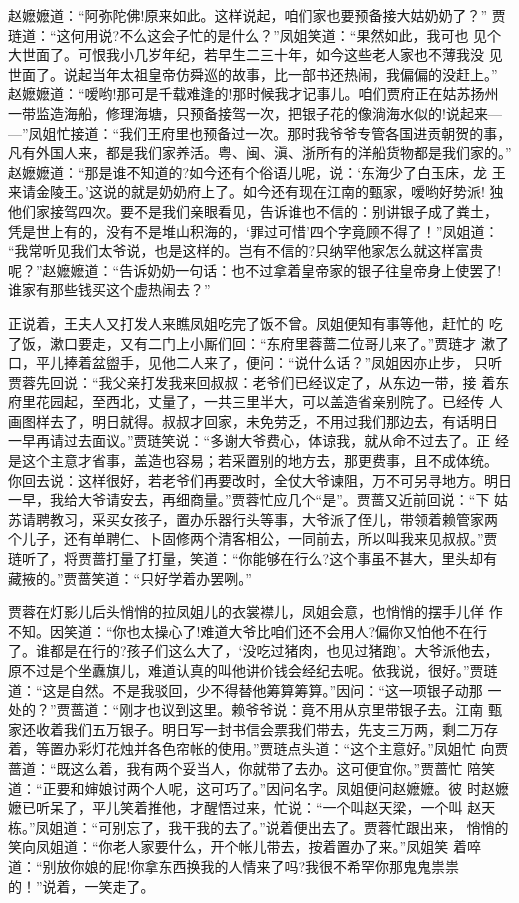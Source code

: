 赵嬷嬷道：“阿弥陀佛!原来如此。这样说起，咱们家也要预备接大姑奶奶了？”
贾琏道：“这何用说?不么这会子忙的是什么？”凤姐笑道：“果然如此，我可也
见个大世面了。可恨我小几岁年纪，若早生二三十年，如今这些老人家也不薄我没
见世面了。说起当年太祖皇帝仿舜巡的故事，比一部书还热闹，我偏偏的没赶上。”
赵嬷嬷道：“嗳哟!那可是千载难逢的!那时候我才记事儿。咱们贾府正在姑苏扬州
一带监造海船，修理海塘，只预备接驾一次，把银子花的像淌海水似的!说起来—
—”凤姐忙接道：“我们王府里也预备过一次。那时我爷爷专管各国进贡朝贺的事，
凡有外国人来，都是我们家养活。粤、闽、滇、浙所有的洋船货物都是我们家的。”
赵嬷嬷道：“那是谁不知道的?如今还有个俗语儿呢，说：‘东海少了白玉床，龙
王来请金陵王。’这说的就是奶奶府上了。如今还有现在江南的甄家，嗳哟好势派!
独他们家接驾四次。要不是我们亲眼看见，告诉谁也不信的：别讲银子成了粪土，
凭是世上有的，没有不是堆山积海的，‘罪过可惜’四个字竟顾不得了！”凤姐道：
“我常听见我们太爷说，也是这样的。岂有不信的?只纳罕他家怎么就这样富贵
呢？”赵嬷嬷道：“告诉奶奶一句话：也不过拿着皇帝家的银子往皇帝身上使罢了!
谁家有那些钱买这个虚热闹去？”

正说着，王夫人又打发人来瞧凤姐吃完了饭不曾。凤姐便知有事等他，赶忙的
吃了饭，漱口要走，又有二门上小厮们回：“东府里蓉蔷二位哥儿来了。”贾琏才
漱了口，平儿捧着盆盥手，见他二人来了，便问：“说什么话？”凤姐因亦止步，
只听贾蓉先回说：“我父亲打发我来回叔叔：老爷们已经议定了，从东边一带，接
着东府里花园起，至西北，丈量了，一共三里半大，可以盖造省亲别院了。已经传
人画图样去了，明日就得。叔叔才回家，未免劳乏，不用过我们那边去，有话明日
一早再请过去面议。”贾琏笑说：“多谢大爷费心，体谅我，就从命不过去了。正
经是这个主意才省事，盖造也容易；若采置别的地方去，那更费事，且不成体统。
你回去说：这样很好，若老爷们再要改时，全仗大爷谏阻，万不可另寻地方。明日
一早，我给大爷请安去，再细商量。”贾蓉忙应几个“是”。贾蔷又近前回说：“下
姑苏请聘教习，采买女孩子，置办乐器行头等事，大爷派了侄儿，带领着赖管家两
个儿子，还有单聘仁、卜固修两个清客相公，一同前去，所以叫我来见叔叔。”贾
琏听了，将贾蔷打量了打量，笑道：“你能够在行么?这个事虽不甚大，里头却有
藏掖的。”贾蔷笑道：“只好学着办罢咧。”

贾蓉在灯影儿后头悄悄的拉凤姐儿的衣裳襟儿，凤姐会意，也悄悄的摆手儿佯
作不知。因笑道：“你也太操心了!难道大爷比咱们还不会用人?偏你又怕他不在行
了。谁都是在行的?孩子们这么大了，‘没吃过猪肉，也见过猪跑’。大爷派他去，
原不过是个坐纛旗儿，难道认真的叫他讲价钱会经纪去呢。依我说，很好。”贾琏
道：“这是自然。不是我驳回，少不得替他筹算筹算。”因问：“这一项银子动那
一处的？”贾蔷道：“刚才也议到这里。赖爷爷说：竟不用从京里带银子去。江南
甄家还收着我们五万银子。明日写一封书信会票我们带去，先支三万两，剩二万存
着，等置办彩灯花烛并各色帘帐的使用。”贾琏点头道：“这个主意好。”凤姐忙
向贾蔷道：“既这么着，我有两个妥当人，你就带了去办。这可便宜你。”贾蔷忙
陪笑道：“正要和婶娘讨两个人呢，这可巧了。”因问名字。凤姐便问赵嬷嬷。彼
时赵嬷嬷已听呆了，平儿笑着推他，才醒悟过来，忙说：“一个叫赵天梁，一个叫
赵天栋。”凤姐道：“可别忘了，我干我的去了。”说着便出去了。贾蓉忙跟出来，
悄悄的笑向凤姐道：“你老人家要什么，开个帐儿带去，按着置办了来。”凤姐笑
着啐道：“别放你娘的屁!你拿东西换我的人情来了吗?我很不希罕你那鬼鬼祟祟
的！”说着，一笑走了。

